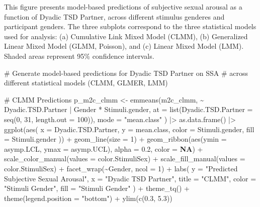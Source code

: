 \documentclass[
  bookmarksnumbered]{article}
\newenvironment{Shaded}{\begin{snugshade}}{\end{snugshade}}
\newcommand{\AttributeTok}[1]{\textcolor[rgb]{0.80,0.80,0.80}{#1}}
\newcommand{\CommentTok}[1]{\textcolor[rgb]{0.50,0.62,0.50}{#1}}
\newcommand{\ConstantTok}[1]{\textcolor[rgb]{0.86,0.64,0.64}{\textbf{#1}}}
\newcommand{\DecValTok}[1]{\textcolor[rgb]{0.86,0.86,0.80}{#1}}
\newcommand{\FloatTok}[1]{\textcolor[rgb]{0.75,0.75,0.82}{#1}}
\newcommand{\FunctionTok}[1]{\textcolor[rgb]{0.94,0.94,0.56}{#1}}
\newcommand{\NormalTok}[1]{\textcolor[rgb]{0.80,0.80,0.80}{#1}}
\newcommand{\OtherTok}[1]{\textcolor[rgb]{0.94,0.94,0.56}{#1}}
\newcommand{\SpecialCharTok}[1]{\textcolor[rgb]{0.86,0.64,0.64}{#1}}
\newcommand{\StringTok}[1]{\textcolor[rgb]{0.80,0.58,0.58}{#1}}
\begin{document}
This figure presents model-based predictions of subjective sexual arousal as a function of Dyadic TSD Partner, across different stimulus genderes and participant genders. The three subplots correspond to the three statistical models used for analysis: (a) Cumulative Link Mixed Model (CLMM), (b) Generalized Linear Mixed Model (GLMM, Poisson), and (c) Linear Mixed Model (LMM). Shaded areas represent 95\% confidence intervals.

\begin{Shaded}
\begin{Highlighting}[]
\CommentTok{\# Generate model{-}based predictions for Dyadic TSD Partner on SSA}
\CommentTok{\# across different statistical models (CLMM, GLMER, LMM)}

\CommentTok{\# CLMM Predictions}
\NormalTok{p\_m2c\_clmm }\OtherTok{\textless{}{-}} \FunctionTok{emmeans}\NormalTok{(m2c\_clmm, }\SpecialCharTok{\textasciitilde{}}\NormalTok{ Dyadic.TSD.Partner }\SpecialCharTok{|}\NormalTok{ Gender }\SpecialCharTok{*}\NormalTok{ Stimuli.gender,}
  \AttributeTok{at =} \FunctionTok{list}\NormalTok{(}\AttributeTok{Dyadic.TSD.Partner =} \FunctionTok{seq}\NormalTok{(}\DecValTok{0}\NormalTok{, }\DecValTok{31}\NormalTok{, }\AttributeTok{length.out =} \DecValTok{100}\NormalTok{)),}
  \AttributeTok{mode =} \StringTok{"mean.class"}
\NormalTok{) }\SpecialCharTok{|\textgreater{}}
  \FunctionTok{as.data.frame}\NormalTok{() }\SpecialCharTok{|\textgreater{}}
  \FunctionTok{ggplot}\NormalTok{(}\FunctionTok{aes}\NormalTok{(}
    \AttributeTok{x =}\NormalTok{ Dyadic.TSD.Partner, }\AttributeTok{y =}\NormalTok{ mean.class,}
    \AttributeTok{color =}\NormalTok{ Stimuli.gender, }\AttributeTok{fill =}\NormalTok{ Stimuli.gender}
\NormalTok{  )) }\SpecialCharTok{+}
  \FunctionTok{geom\_line}\NormalTok{(}\AttributeTok{size =} \DecValTok{1}\NormalTok{) }\SpecialCharTok{+}
  \FunctionTok{geom\_ribbon}\NormalTok{(}\FunctionTok{aes}\NormalTok{(}\AttributeTok{ymin =}\NormalTok{ asymp.LCL, }\AttributeTok{ymax =}\NormalTok{ asymp.UCL), }\AttributeTok{alpha =} \FloatTok{0.2}\NormalTok{, }\AttributeTok{color =} \ConstantTok{NA}\NormalTok{) }\SpecialCharTok{+}
  \FunctionTok{scale\_color\_manual}\NormalTok{(}\AttributeTok{values =}\NormalTok{ color.StimuliSex) }\SpecialCharTok{+}
  \FunctionTok{scale\_fill\_manual}\NormalTok{(}\AttributeTok{values =}\NormalTok{ color.StimuliSex) }\SpecialCharTok{+}
  \FunctionTok{facet\_wrap}\NormalTok{(}\SpecialCharTok{\textasciitilde{}}\NormalTok{Gender, }\AttributeTok{ncol =} \DecValTok{1}\NormalTok{) }\SpecialCharTok{+}
  \FunctionTok{labs}\NormalTok{(}
    \AttributeTok{y =} \StringTok{"Predicted Subjective Sexual Arousal"}\NormalTok{,}
    \AttributeTok{x =} \StringTok{"Dyadic TSD Partner"}\NormalTok{,}
    \AttributeTok{title =} \StringTok{"CLMM"}\NormalTok{,}
    \AttributeTok{color =} \StringTok{"Stimuli Gender"}\NormalTok{, }\AttributeTok{fill =} \StringTok{"Stimuli Gender"}
\NormalTok{  ) }\SpecialCharTok{+}
  \FunctionTok{theme\_tq}\NormalTok{() }\SpecialCharTok{+}
  \FunctionTok{theme}\NormalTok{(}\AttributeTok{legend.position =} \StringTok{"bottom"}\NormalTok{) }\SpecialCharTok{+}
  \FunctionTok{ylim}\NormalTok{(}\FunctionTok{c}\NormalTok{(}\FloatTok{0.3}\NormalTok{, }\FloatTok{5.3}\NormalTok{))}


\end{Highlighting}
\end{Shaded}
\end{document}
